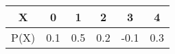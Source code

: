 \begin{center}
\begin{tabular}{|c|c|c|c|c|c|} 
    \hline
    X & 0 & 1 & 2 & 3 & 4 
    \\
    \hline
    P(X) & 0.1 & 0.5 & 0.2 & -0.1 & 0.3 
    \\
    \hline
\end{tabular}
\end{center}   